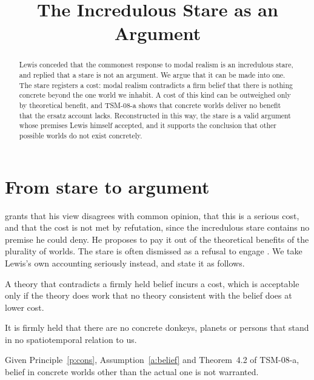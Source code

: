 \documentclass{situationist-preprint}
\title{The Incredulous Stare as an Argument}
\begin{document}
\maketitle

\begin{abstract}
Lewis conceded that the commonest response to modal realism is an incredulous stare, and replied that a stare is not an argument. We argue that it can be made into one. The stare registers a cost: modal realism contradicts a firm belief that there is nothing concrete beyond the one world we inhabit. A cost of this kind can be outweighed only by theoretical benefit, and TSM-08-a shows that concrete worlds deliver no benefit that the ersatz account lacks. Reconstructed in this way, the stare is a valid argument whose premises Lewis himself accepted, and it supports the conclusion that other possible worlds do not exist concretely.
\end{abstract}

\section{From stare to argument}

\citet[\S2.8]{Lewis1986} grants that his view disagrees with common opinion, that this is a serious cost, and that the cost is not met by refutation, since the incredulous stare contains no premise he could deny. He proposes to pay it out of the theoretical benefits of the plurality of worlds. The stare is often dismissed as a refusal to engage \citep{Lycan1991}. We take Lewis's own accounting seriously instead, and state it as follows.

\begin{principle}[Conservatism]\label{p:cons}
A theory that contradicts a firmly held belief incurs a cost, which is acceptable only if the theory does work that no theory consistent with the belief does at lower cost.
\end{principle}

\begin{assumption}\label{a:belief}
It is firmly held that there are no concrete donkeys, planets or persons that stand in no spatiotemporal relation to us.
\end{assumption}

\begin{proposition}\label{p:stare}
Given Principle~\ref{p:cons}, Assumption~\ref{a:belief} and Theorem~4.2 of TSM-08-a, belief in concrete worlds other than the actual one is not warranted.
\end{proposition}
\end{document}
